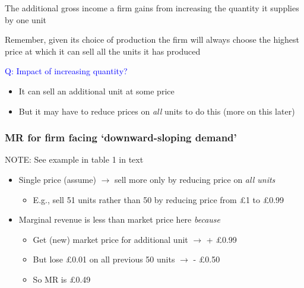 \documentclass[]{article}
\providecommand{\tightlist}{%
  \setlength{\itemsep}{0pt}\setlength{\parskip}{0pt}}
\begin{document}
\begin{description}
\tightlist
\item[Marginal revenue]
The additional gross income a firm gains from increasing the quantity it supplies by one unit
\end{description}

Remember, given its choice of production the firm will always choose the highest price
at which it can sell all the units it has produced

\textcolor{blue}{Q: Impact of increasing quantity?}

\bigskip

\begin{itemize}
\tightlist
\item
  It can sell an additional unit at some price
\item
  But it may have to reduce prices on \emph{all} units to do this (more on this later)
\end{itemize}

\hypertarget{mr-for-firm-facing-downward-sloping-demand}{%
\subsubsection{MR for firm facing `downward-sloping demand'}\label{mr-for-firm-facing-downward-sloping-demand}}

NOTE: See example in table 1 in text

\begin{itemize}
\tightlist
\item
  Single price (assume) \(\rightarrow\) sell more only by reducing price on \emph{all units}

  \begin{itemize}
  \tightlist
  \item
    E.g., sell 51 units rather than 50 by reducing price from £1 to £0.99
  \end{itemize}
\item
  Marginal revenue is less than market price here \emph{because}

  \begin{itemize}
  \tightlist
  \item
    Get (new) market price for additional unit \(\rightarrow\) + £0.99
  \item
    But lose £0.01 on all previous 50 units \(\rightarrow\) - £0.50
  \item
    So MR is £0.49
  \end{itemize}
\end{itemize}
\end{document}
